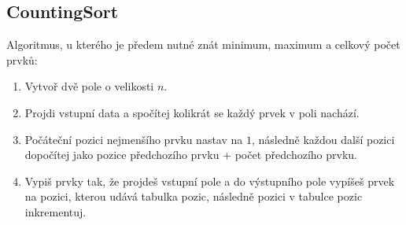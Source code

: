   \subsection{CountingSort}
    Algoritmus, u kterého je předem nutné znát minimum, maximum a celkový počet prvků:
    \begin{enumerate}
      \item Vytvoř dvě pole o velikosti $n$.
      \item Projdi vstupní data a spočítej kolikrát se každý prvek v poli nachází.
      \item Počáteční pozici nejmenšího prvku nastav na $1$, následně každou další pozici dopočítej jako pozice předchozího prvku + počet předchozího prvku.
      \item Vypiš prvky tak, že projdeš vstupní pole a do výstupního pole vypíšeš prvek na pozici, kterou udává tabulka pozic, následně pozici v tabulce pozic inkrementuj.
    \end{enumerate}

